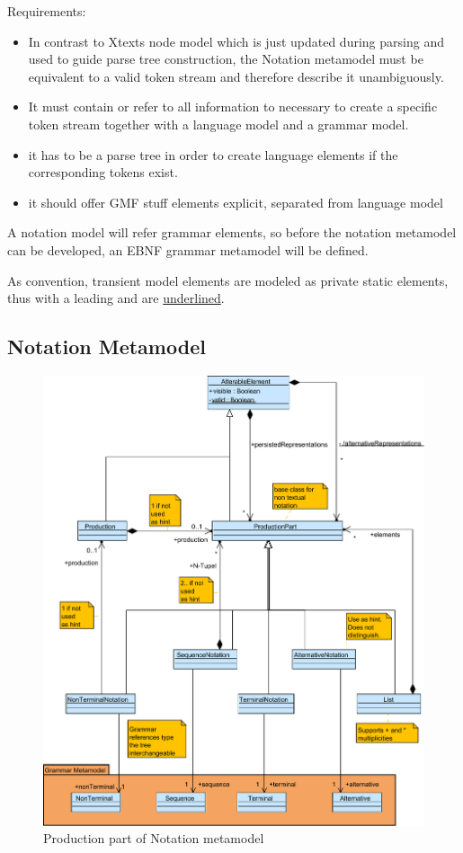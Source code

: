 Requirements:
\begin{itemize}
	\item In contrast to Xtexts node model which is just updated during parsing and used to guide parse tree construction, the Notation metamodel must be equivalent to a valid token stream and therefore describe it unambiguously. 
	\item It must contain or refer to all information to necessary to create a specific token stream together with a language model and a grammar model.   
	\item it has to be a parse tree in order to create language elements if the corresponding tokens exist.
	\item it should offer GMF stuff elements 
	explicit, separated from language model
\end{itemize}

A notation model will refer grammar elements, so before the notation metamodel can be developed, an EBNF grammar metamodel will be defined.

As convention, transient model elements are modeled as private static elements, thus with a leading \code{-} and are \underline{underlined}.


\subsection{Notation Metamodel}
\begin{figure}
\centering
\includegraphics[scale=0.65]{gfx/ex/Notation_Prod} 
\caption{Production part of Notation metamodel}
\label{MM:Not:Prod}
\end{figure}

